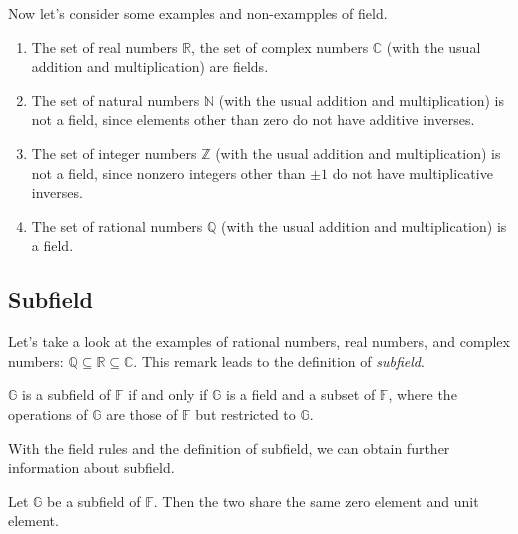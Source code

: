 Now let's consider some examples and non-exampples of field.

\begin{example}
	\begin{enumerate}[label = (\alph*)]
		\item The set of real numbers $\mathbb{R}$, the set of complex numbers $\mathbb{C}$ (with the usual addition and multiplication) are fields.
		\item The set of natural numbers $\mathbb{N}$ (with the usual addition and multiplication) is not a field, since elements other than zero do not have additive inverses.
		\item The set of integer numbers $\mathbb{Z}$ (with the usual addition and multiplication) is not a field, since nonzero integers other than $\pm 1$ do not have multiplicative inverses.
		\item The set of rational numbers $\mathbb{Q}$ (with the usual addition and multiplication) is a field.
	\end{enumerate}
\end{example}

\subsection{Subfield}

Let's take a look at the examples of rational numbers, real numbers, and complex numbers: $\mathbb{Q}\subseteq\mathbb{R}\subseteq\mathbb{C}$. This remark leads to the definition of \textit{subfield}.

\begin{definition}[Subfield]
	$\mathbb{G}$ is a subfield of $\mathbb{F}$ if and only if $\mathbb{G}$ is a field and a subset of $\mathbb{F}$, where the operations of $\mathbb{G}$ are those of $\mathbb{F}$ but restricted to $\mathbb{G}$.
\end{definition}

With the field rules and the definition of subfield, we can obtain further information about subfield.

\begin{theorem}
	Let $\mathbb{G}$ be a subfield of $\mathbb{F}$. Then the two share the same zero element and unit element.
\end{theorem}

